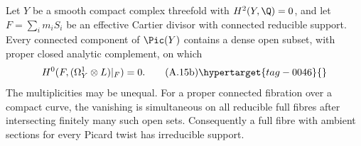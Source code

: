\begin{proposition}\hypertarget{tag-01AP}{}\label{cdp:st:A.3.5}

Let $Y$ be a smooth compact complex threefold with $H^2(Y,\Q)=0$, and let $F=\sum_i m_iS_i$ be an effective Cartier divisor with connected reducible support. Every connected component of $\Pic(Y)$ contains a dense open subset, with proper closed analytic complement, on which
\[
 H^0(F,(\Omega_Y^1\otimes L)|_F)=0.
 \tag{A.15b}\hypertarget{tag-0046}{}\label{cdp:eq:A.15b}
\]
The multiplicities may be unequal. For a proper connected fibration over a compact curve, the vanishing is simultaneous on all reducible full fibres after intersecting finitely many such open sets. Consequently a full fibre with ambient sections for every Picard twist has irreducible support.
\end{proposition}


